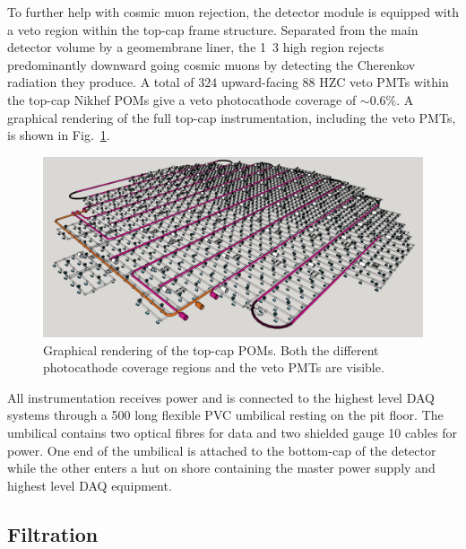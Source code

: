 To further help with cosmic muon rejection, the \chipsfive detector module is equipped with a veto
region within the top-cap frame structure. Separated from the main detector volume by a
geomembrane liner, the \unit{1.3}{} high region rejects predominantly downward going
cosmic muons by detecting the Cherenkov radiation they produce. A total of $324$ upward-facing
\unit{88}{} HZC veto PMTs within the top-cap Nikhef POMs give a veto photocathode
coverage of $\sim0.6\%$. A graphical rendering of the full top-cap instrumentation, including the
veto PMTs, is shown in Fig.~\ref{fig:top_cap}.

\begin{figure} %
    \includegraphics[width=\textwidth]{diagrams/4-chips/top_cap.png}
    \caption[Graphical rendering of the top-cap Planar Optical Modules]
    {Graphical rendering of the top-cap POMs. Both the different photocathode coverage regions and
        the veto PMTs are visible.}
    \label{fig:top_cap}
\end{figure}

All \chipsfive instrumentation receives power and is connected to the highest level DAQ systems
through a \unit{500}{} long flexible PVC umbilical resting on the pit floor. The
umbilical contains two optical fibres for data and two shielded gauge 10 cables for power. One end
of the umbilical is attached to the bottom-cap of the detector while the other enters a hut on
shore containing the master power supply and highest level DAQ equipment.

\subsection{Filtration} %
\label{sec:chips_detector_water} %

